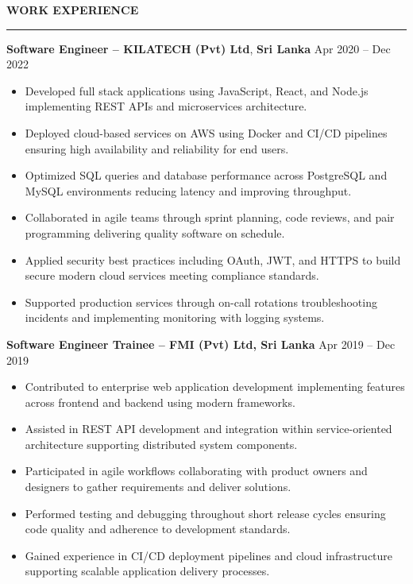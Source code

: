 \documentclass[10pt,letterpaper]{article}
\begin{document}
\vspace{8pt}

\textbf{WORK EXPERIENCE}\\[-8pt]
\noindent\rule{\textwidth}{1pt}

\vspace{-2pt}

\textbf{Software Engineer -- KILATECH (Pvt) Ltd}, \textbf{Sri Lanka} \hfill Apr 2020 -- Dec 2022

\vspace{-1pt}

\begin{itemize}
\item Developed full stack applications using JavaScript, React, and Node.js implementing REST APIs and microservices architecture.
\item Deployed cloud-based services on AWS using Docker and CI/CD pipelines ensuring high availability and reliability for end users.
\item Optimized SQL queries and database performance across PostgreSQL and MySQL environments reducing latency and improving throughput.
\item Collaborated in agile teams through sprint planning, code reviews, and pair programming delivering quality software on schedule.
\item Applied security best practices including OAuth, JWT, and HTTPS to build secure modern cloud services meeting compliance standards.
\item Supported production services through on-call rotations troubleshooting incidents and implementing monitoring with logging systems.
\end{itemize}

\textbf{Software Engineer Trainee -- FMI (Pvt) Ltd, Sri Lanka} \hfill Apr 2019 -- Dec 2019

\vspace{-1pt}

\begin{itemize}
\item Contributed to enterprise web application development implementing features across frontend and backend using modern frameworks.
\item Assisted in REST API development and integration within service-oriented architecture supporting distributed system components.
\item Participated in agile workflows collaborating with product owners and designers to gather requirements and deliver solutions.
\item Performed testing and debugging throughout short release cycles ensuring code quality and adherence to development standards.
\item Gained experience in CI/CD deployment pipelines and cloud infrastructure supporting scalable application delivery processes.
\end{itemize}
\end{document}
